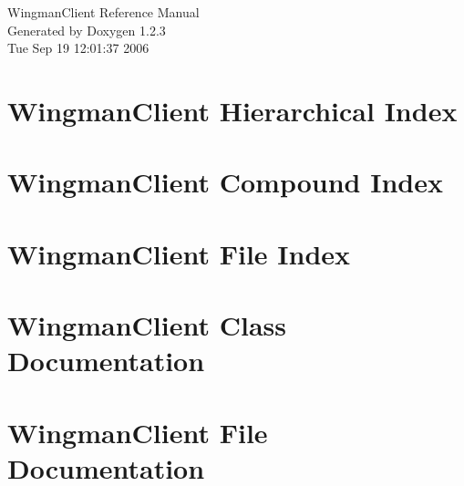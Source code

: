 \documentclass[a4paper]{book}
\begin{document}
\begin{titlepage}
\vspace*{7cm}
\begin{center}
{\Large Wingman\-Client Reference Manual}\\
\vspace*{1cm}
{\large Generated by Doxygen 1.2.3}\\
\vspace*{0.5cm}
{\small Tue Sep 19 12:01:37 2006}\\
\end{center}
\end{titlepage}
\clearemptydoublepage
{}
\tableofcontents
\clearemptydoublepage
{}
\chapter{Wingman\-Client Hierarchical Index}

\chapter{Wingman\-Client Compound Index}

\chapter{Wingman\-Client File Index}

\chapter{Wingman\-Client Class Documentation}


\chapter{Wingman\-Client File Documentation}

\printindex
\end{document}
